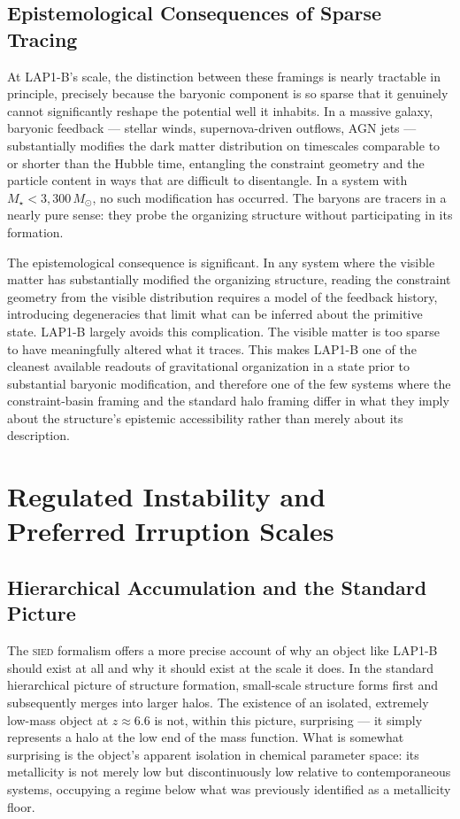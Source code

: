 \documentclass[12pt, a4paper]{article}
\newcommand{\Msun}{M_{\odot}}
\newcommand{\Mstar}{M_{\star}}
\newcommand{\SIED}{\textsc{sied}}
\theoremstyle{definition}
\begin{document}
\subsection{Epistemological Consequences of Sparse Tracing}

At LAP1-B's scale, the distinction between these framings is nearly
tractable in principle, precisely because the baryonic component is so sparse
that it genuinely cannot significantly reshape the potential well it inhabits.
In a massive galaxy, baryonic feedback --- stellar winds, supernova-driven
outflows, AGN jets --- substantially modifies the dark matter distribution on
timescales comparable to or shorter than the Hubble time, entangling the
constraint geometry and the particle content in ways that are difficult to
disentangle. In a system with $\Mstar < 3{,}300\,\Msun$, no such modification
has occurred. The baryons are tracers in a nearly pure sense: they probe the
organizing structure without participating in its formation.

The epistemological consequence is significant. In any system where the
visible matter has substantially modified the organizing structure, reading
the constraint geometry from the visible distribution requires a model of
the feedback history, introducing degeneracies that limit what can be inferred
about the primitive state. LAP1-B largely avoids this complication. The
visible matter is too sparse to have meaningfully altered what it traces.
This makes LAP1-B one of the cleanest available readouts of gravitational
organization in a state prior to substantial baryonic modification, and
therefore one of the few systems where the constraint-basin framing and the
standard halo framing differ in what they imply about the structure's
epistemic accessibility rather than merely about its description.

\section{Regulated Instability and Preferred Irruption Scales}
\label{sec:sied}

\subsection{Hierarchical Accumulation and the Standard Picture}

The \SIED{} formalism offers a more precise account of why an object like
LAP1-B should exist at all and why it should exist at the scale it does.
In the standard hierarchical picture of structure formation, small-scale
structure forms first and subsequently merges into larger halos. The existence
of an isolated, extremely low-mass object at $z \approx 6.6$ is not, within
this picture, surprising --- it simply represents a halo at the low end of the
mass function. What is somewhat surprising is the object's apparent isolation
in chemical parameter space: its metallicity is not merely low but
discontinuously low relative to contemporaneous systems, occupying a regime
below what was previously identified as a metallicity floor.
\end{document}
